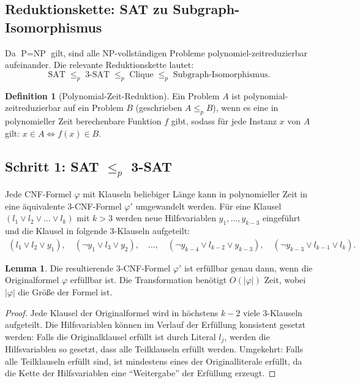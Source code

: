 ﻿\documentclass[a4paper,12pt]{article}
\theoremstyle{definition}
\newtheorem{definition}{Definition}
\newtheorem{lemma}{Lemma}
\begin{document}
\subsection{Reduktionskette: SAT zu Subgraph-Isomorphismus}

Da $\text{P} = \text{NP}$ gilt, sind alle NP-vollständigen Probleme polynomiel-zeitreduzierbar aufeinander. Die relevante Reduktionskette lautet:
\[
\text{SAT} \;\leq_p\; \text{3-SAT} \;\leq_p\; \text{Clique} \;\leq_p\; \text{Subgraph-Isomorphismus}.
\]

\begin{definition}[Polynomial-Zeit-Reduktion]
    Ein Problem $A$ ist polynomial-zeitreduzierbar auf ein Problem $B$ (geschrieben $A \leq_p B$), wenn es eine in polynomieller Zeit berechenbare Funktion $f$ gibt, sodass für jede Instanz $x$ von $A$ gilt: $x \in A \Leftrightarrow f(x) \in B$.
\end{definition}

\subsection{Schritt 1: SAT $\leq_p$ 3-SAT}

Jede CNF-Formel $\varphi$ mit Klauseln beliebiger Länge kann in polynomieller Zeit in eine äquivalente 3-CNF-Formel $\varphi'$ umgewandelt werden. Für eine Klausel $(l_1 \lor l_2 \lor \ldots \lor l_k)$ mit $k > 3$ werden neue Hilfsvariablen $y_1, \ldots, y_{k-3}$ eingeführt und die Klausel in folgende 3-Klauseln aufgeteilt:
\begin{align*}
    (l_1 \lor l_2 \lor y_1), \quad
    (\neg y_1 \lor l_3 \lor y_2), \quad
    \ldots, \quad
    (\neg y_{k-4} \lor l_{k-2} \lor y_{k-3}), \quad
    (\neg y_{k-3} \lor l_{k-1} \lor l_k).
\end{align*}

\begin{lemma}
    Die resultierende 3-CNF-Formel $\varphi'$ ist erfüllbar genau dann, wenn die Originalformel $\varphi$ erfüllbar ist. Die Transformation benötigt $O(|\varphi|)$ Zeit, wobei $|\varphi|$ die Größe der Formel ist.
\end{lemma}

\begin{proof}
    Jede Klausel der Originalformel wird in höchstens $k - 2$ viele 3-Klauseln aufgeteilt. Die Hilfsvariablen können im Verlauf der Erfüllung konsistent gesetzt werden: Falls die Originalklausel erfüllt ist durch Literal $l_j$, werden die Hilfsvariablen so gesetzt, dass alle Teilklauseln erfüllt werden. Umgekehrt: Falls alle Teilklauseln erfüllt sind, ist mindestens eines der Originalliterale erfüllt, da die Kette der Hilfsvariablen eine ``Weitergabe'' der Erfüllung erzeugt.
\end{proof}
\end{document}
